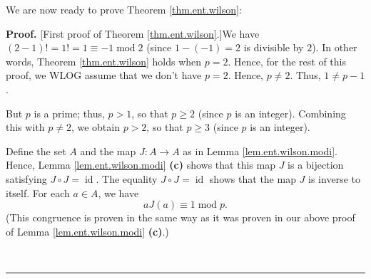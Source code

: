 \documentclass[numbers=enddot,12pt,final,onecolumn,notitlepage]{scrartcl}%
\numberwithin{exer}{subsection}
\theoremstyle{definition}
\newenvironment{proof}[1][Proof]{\noindent\textbf{#1.} }{\ \rule{0.5em}{0.5em}}
\begin{document}
We are now ready to prove Theorem \ref{thm.ent.wilson}:

\begin{proof}
[First proof of Theorem \ref{thm.ent.wilson}.]We have $\left(  2-1\right)
!=1!=1\equiv-1\operatorname{mod}2$ (since $1-\left(  -1\right)  =2$ is
divisible by $2$). In other words, Theorem \ref{thm.ent.wilson} holds when
$p=2$. Hence, for the rest of this proof, we WLOG assume that we don't have
$p=2$. Hence, $p\neq2$. Thus, $1 \neq p-1$.

But $p$ is a prime; thus, $p>1$, so that $p\geq2$ (since $p$ is an integer).
Combining this with $p\neq2$, we obtain $p>2$, so that $p\geq3$ (since $p$ is
an integer).

Define the set $A$ and the map $J:A\rightarrow A$ as in Lemma
\ref{lem.ent.wilson.modi}. Hence, Lemma \ref{lem.ent.wilson.modi} \textbf{(c)}
shows that this map $J$ is a bijection satisfying $J\circ J=\operatorname*{id}%
$. The equality $J \circ J = \operatorname{id}$ shows that the map $J$ is
inverse to itself. For each $a\in A$, we have
\begin{equation}
aJ\left(  a\right)  \equiv1\operatorname{mod}p. \label{pf.thm.ent.wilson.aJa}%
\end{equation}
(This congruence is proven in the same way as it was proven in our above proof
of Lemma \ref{lem.ent.wilson.modi} \textbf{(c)}.)


\end{proof}
\end{document}
